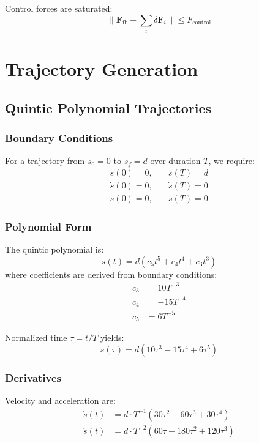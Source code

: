 \documentclass[12pt,a4paper]{article}
\begin{document}
Control forces are saturated:
\begin{equation}
    \|\mathbf{F}_{\text{fb}} + \sum_i \delta\mathbf{F}_i\| \leq F_{\text{control}}
    \label{eq:control_saturation}
\end{equation}

\section{Trajectory Generation}
\label{sec:trajectory}

\subsection{Quintic Polynomial Trajectories}

\subsubsection{Boundary Conditions}
For a trajectory from $s_0 = 0$ to $s_f = d$ over duration $T$, we require:
\begin{align}
    s(0) = 0, \quad & s(T) = d \\
    \dot{s}(0) = 0, \quad & \dot{s}(T) = 0 \\
    \ddot{s}(0) = 0, \quad & \ddot{s}(T) = 0
\end{align}

\subsubsection{Polynomial Form}
The quintic polynomial is:
\begin{equation}
    s(t) = d(c_5t^5 + c_4t^4 + c_3t^3)
    \label{eq:quintic}
\end{equation}
where coefficients are derived from boundary conditions:
\begin{align}
    c_3 &= 10T^{-3} \\
    c_4 &= -15T^{-4} \\
    c_5 &= 6T^{-5}
\end{align}

Normalized time $\tau = t/T$ yields:
\begin{equation}
    s(\tau) = d(10\tau^3 - 15\tau^4 + 6\tau^5)
\end{equation}

\subsubsection{Derivatives}
Velocity and acceleration are:
\begin{align}
    \dot{s}(t) &= d \cdot T^{-1}(30\tau^2 - 60\tau^3 + 30\tau^4) \\
    \ddot{s}(t) &= d \cdot T^{-2}(60\tau - 180\tau^2 + 120\tau^3)
\end{align}
\end{document}
